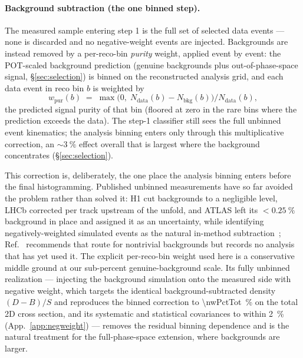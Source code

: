 \paragraph{Background subtraction (the one binned step).}
The measured sample entering step 1 is the full set of selected data events
--- none is discarded and no negative-weight events are injected. Backgrounds
are instead removed by a per-reco-bin \emph{purity} weight, applied event by
event: the POT-scaled
background prediction (genuine backgrounds plus out-of-phase-space signal,
\S\ref{sec:selection}) is binned on the reconstructed analysis grid, and each
data event in reco bin $b$ is weighted by
\begin{equation*}
  w_{\mathrm{pur}}(b) \;=\;
  \max\!\bigl(0,\; N_{\mathrm{data}}(b) - N_{\mathrm{bkg}}(b)\bigr)
  \big/ N_{\mathrm{data}}(b),
\end{equation*}
the predicted signal purity of that bin (floored at zero in the rare bins
where the prediction exceeds the data). The step-1 classifier still sees the
full unbinned event kinematics; the analysis binning enters only through this
multiplicative correction, an ${\sim}\SI{3}{\percent}$ effect overall that is
largest where the background concentrates (\S\ref{sec:selection}).

This correction is, deliberately, the one place the analysis binning enters
before the final histogramming. Published unbinned measurements have so far
avoided the problem rather than solved it: H1 cut backgrounds to a negligible
level, LHCb corrected per track upstream of the unfold, and ATLAS left its
$<\SI{0.25}{\percent}$ background in place and assigned it as an uncertainty,
while identifying negatively-weighted simulated events as the natural
in-method subtraction~\cite{ATLAS:2024jets,Andreassen:2021zzk};
Ref.~\cite{unbinnedguide} recommends that route for nontrivial backgrounds
but records no analysis that has yet used it. The explicit per-reco-bin
weight used here is a conservative middle ground at our sub-percent
genuine-background scale. Its fully unbinned realization --- injecting the
background simulation onto the measured side with negative weight, which
targets the identical background-subtracted density $(D-B)/S$ and reproduces
the binned correction to \SI{\nwPctTot}{\percent} on the total 2D cross
section, and its systematic and statistical covariances to within
\SI{2}{\percent} (App.~\ref{app:negweight}) --- removes the residual binning dependence
and is the natural treatment for the full-phase-space extension, where
backgrounds are larger.

